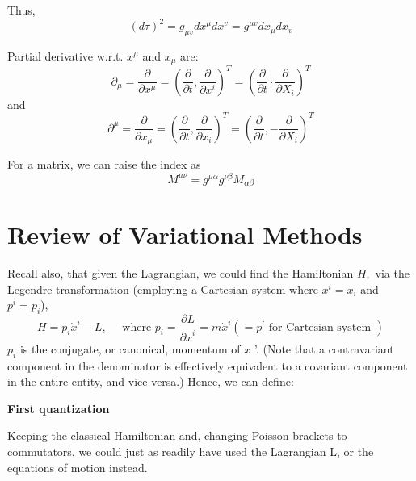 Thus,
\begin{equation}
(d \tau)^{2}=g_{\mu v} d x^{\mu} d x^{v}=g^{\mu v} d x_{\mu} d x_{v}
\end{equation}
\begin{qt}
Partial derivative w.r.t. $x^{\mu}$ and $x_{\mu}$ are:
\begin{equation}
\partial_{\mu}=\frac{\partial}{\partial x^{\mu}}=\left(\frac{\partial}{\partial t}, \frac{\partial}{\partial x^{i}}\right)^{T}=\left(\frac{\partial}{\partial t} \cdot \frac{\partial}{\partial X_{i}}\right)^{T}
\end{equation}
and
\begin{equation}
\partial^{\mu}=\frac{\partial}{\partial x_{\mu}}=\left(\frac{\partial}{\partial t}, \frac{\partial}{\partial x_{i}}\right)^{T}=\left(\frac{\partial}{\partial t},-\frac{\partial}{\partial X_{i}}\right)^{T}
\end{equation}
\end{qt}
For a matrix, we can raise the index as
\begin{equation}
M^{\mu \nu}=g^{\mu \alpha} g^{\nu \beta} M_{\alpha \beta}
\end{equation}
\section{Review of Variational Methods}
Recall also, that given the Lagrangian, we could find the Hamiltonian $H,$ via the Legendre transformation (employing a Cartesian system where $x^{i}=x_{i}$ and $p^{i}=p_{i}$),
\begin{equation}
H=p_{i} \dot{x}^{i}-L, \quad \text { where } p_{i}=\frac{\partial L}{\partial \dot{x}^{i}}=m \dot{x}^{i}\left(=p^{\prime} \text { for Cartesian system }\right)
\end{equation}
$p_{i}$ is the conjugate, or canonical, momentum of $x$ '. (Note that a contravariant component in the denominator is effectively equivalent to a covariant component in the entire entity, and vice versa.) Hence, we can define:
\begin{qt}
\textbf{First quantization}

Keeping the classical Hamiltonian and, changing Poisson brackets to commutators, we could just as readily have used the Lagrangian L, or the equations of motion instead.
\end{qt}

